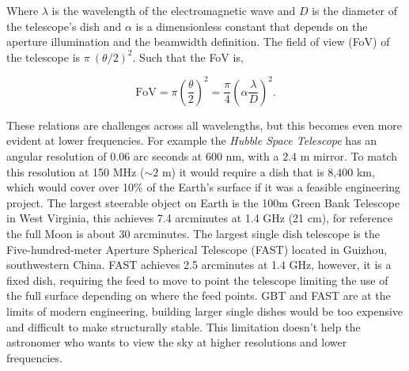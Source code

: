 Where $\lambda$ is the wavelength of the electromagnetic wave and $D$ is the diameter of the telescope's dish and $\alpha$ is a dimensionless constant that depends on the aperture illumination and the beamwidth definition. The field of view (FoV) of the telescope is $\pi~(\theta/2)^2$. Such that the FoV is, 

\begin{equation}
    \text{FoV} = \pi \left( \frac{\theta}{2} \right)^2 = \frac{\pi}{4}
    \left(\alpha\frac{\lambda}{D}\right)^2.
\end{equation}

These relations are challenges across all wavelengths, but this becomes even more evident at lower frequencies. For example the \textit{Hubble Space Telescope} has an angular resolution of 0.06 arc seconds at 600 nm, with a 2.4 m mirror. To match this resolution at 150 MHz ($\sim 2$ m) it would require a dish that is 8,400 km, which would cover over 10\% of the Earth's surface if it was a feasible engineering project. The largest steerable object on Earth is the 100m Green Bank Telescope in West Virginia, this achieves 7.4 arcminutes at 1.4 GHz (21 cm), for reference the full Moon is about 30 arcminutes. The largest single dish telescope is the Five-hundred-meter Aperture Spherical Telescope (FAST) located in Guizhou, southwestern China. FAST achieves 2.5 arcminutes at 1.4 GHz, however, it is a fixed dish, requiring the feed to move to point the telescope limiting the use of the full surface depending on where the feed points. GBT and FAST are at the limits of modern engineering, building larger single dishes would be too expensive and difficult to make structurally stable. This limitation doesn't help the astronomer who wants to view the sky at higher resolutions and lower frequencies. 

